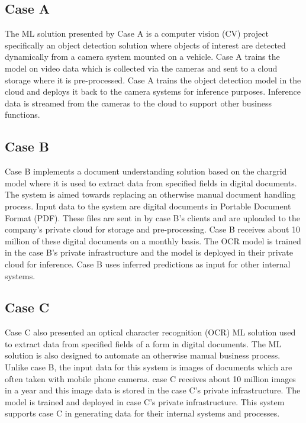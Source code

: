 
\subsection{Case A}
The ML solution presented by Case A is a computer vision (CV) project specifically an object detection solution where objects of interest are detected dynamically from a camera system mounted on a vehicle. Case A trains the model on video data which is collected via the cameras and sent to a cloud storage where it is pre-processed. Case A trains the object detection model in the cloud and deploys it back to the camera systems for inference purposes. Inference data is streamed from the cameras to the cloud to support other business functions.

\subsection{Case B}
Case B implements a document understanding solution based on the chargrid model where it is used to extract data from specified fields in digital documents. The system is aimed towards replacing an otherwise manual document handling process. Input data to the system are digital documents in Portable Document Format (PDF). These files are sent in by case B's clients and are uploaded to the company's private cloud for storage and pre-processing. Case B receives about 10 million of these digital documents on a monthly basis. The OCR model is trained in the case B's private infrastructure and the model is deployed in their private cloud for inference. Case B uses inferred predictions as input for other internal systems.

\subsection{Case C}
Case C also presented an optical character recognition (OCR) ML solution used to extract data from specified fields of a form in digital documents. The ML solution is also designed to automate an otherwise manual business process. Unlike case B, the input data for this system is images of documents which are often taken with mobile phone cameras. case C receives about 10 million images in a year and this image data is stored in the case C's private infrastructure. The model is trained and deployed in case C's private infrastructure. This system supports case C in generating data for their internal systems and processes.

